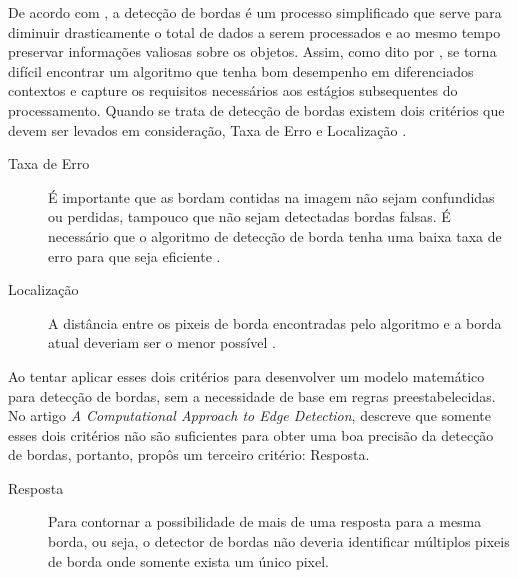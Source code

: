 De acordo com , a detecção de bordas é um processo simplificado que serve para diminuir drasticamente o total de dados a serem processados e ao mesmo tempo preservar informações valiosas sobre os objetos. %
Assim, como dito por , se torna difícil encontrar um algoritmo que tenha bom desempenho em diferenciados contextos e capture os requisitos necessários aos estágios subsequentes do processamento. 
Quando se trata de detecção de bordas existem dois critérios que devem ser levados em consideração, Taxa de Erro e Localização \cite{Canny:1986, Vale:2002}. 

\begin{description}
	\item[Taxa de Erro] É importante que as bordam contidas na imagem não sejam confundidas ou perdidas, tampouco que não sejam detectadas bordas falsas. É necessário que o algoritmo de detecção de borda tenha uma baixa taxa de erro para que seja eficiente \cite{Wangenheim:2014, Canny:1986, Vale:2002}.
	\item[Localização] A distância entre os pixeis de borda encontradas pelo algoritmo e a borda atual deveriam ser o menor possível \cite{Wangenheim:2014}.
\end{description}
Ao tentar aplicar esses dois critérios para desenvolver um modelo matemático para detecção de bordas, sem a necessidade de base em regras preestabelecidas. No artigo 
\textit{A Computational Approach to Edge Detection},  descreve que somente esses dois critérios não são suficientes para obter uma boa precisão da detecção de bordas, portanto, propôs um terceiro critério: Resposta.
\begin{description}
	\item[Resposta] Para contornar a possibilidade de mais de uma resposta para a mesma borda, ou seja, o detector de bordas não deveria identificar múltiplos pixeis de borda onde somente exista um único pixel.
\end{description}

